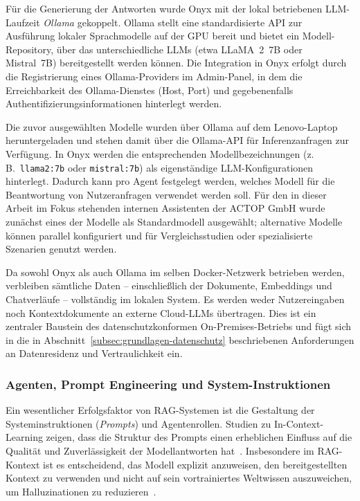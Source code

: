 Für die Generierung der Antworten wurde Onyx mit der lokal betriebenen LLM-Laufzeit \textit{Ollama} gekoppelt.
Ollama stellt eine standardisierte API zur Ausführung lokaler Sprachmodelle auf der GPU bereit und bietet ein Modell-Repository, über das unterschiedliche LLMs (etwa LLaMA~2~7B oder Mistral~7B) bereitgestellt werden können.
Die Integration in Onyx erfolgt durch die Registrierung eines Ollama-Providers im Admin-Panel, in dem die Erreichbarkeit des Ollama-Dienstes (Host, Port) und gegebenenfalls Authentifizierungsinformationen hinterlegt werden.

Die zuvor ausgewählten Modelle wurden über Ollama auf dem Lenovo-Laptop heruntergeladen und stehen damit über die Ollama-API für Inferenzanfragen zur Verfügung.
In Onyx werden die entsprechenden Modellbezeichnungen (z.\,B.\ \texttt{llama2:7b} oder \texttt{mistral:7b}) als eigenständige LLM-Konfigurationen hinterlegt.
Dadurch kann pro Agent festgelegt werden, welches Modell für die Beantwortung von Nutzeranfragen verwendet werden soll.
Für den in dieser Arbeit im Fokus stehenden internen Assistenten der ACTOP GmbH wurde zunächst eines der Modelle als Standardmodell ausgewählt; alternative Modelle können parallel konfiguriert und für Vergleichsstudien oder spezialisierte Szenarien genutzt werden.

Da sowohl Onyx als auch Ollama im selben Docker-Netzwerk betrieben werden, verbleiben sämtliche Daten – einschließlich der Dokumente, Embeddings und Chatverläufe – vollständig im lokalen System.
Es werden weder Nutzereingaben noch Kontextdokumente an externe Cloud-LLMs übertragen.
Dies ist ein zentraler Baustein des datenschutzkonformen On-Premises-Betriebs und fügt sich in die in Abschnitt~\ref{subsec:grundlagen-datenschutz} beschriebenen Anforderungen an Datenresidenz und Vertraulichkeit ein.

\subsubsection{Agenten, Prompt Engineering und System-Instruktionen}

Ein wesentlicher Erfolgsfaktor von RAG-Systemen ist die Gestaltung der Systeminstruktionen (\textit{Prompts}) und Agentenrollen.
Studien zu In-Context-Learning zeigen, dass die Struktur des Prompts einen erheblichen Einfluss auf die Qualität und Zuverlässigkeit der Modellantworten hat~\cite{brown2020language}.
Insbesondere im RAG-Kontext ist es entscheidend, das Modell explizit anzuweisen, den bereitgestellten Kontext zu verwenden und nicht auf sein vortrainiertes Weltwissen auszuweichen, um Halluzinationen zu reduzieren~\cite{gao2023retrieval,ji2023survey}.

